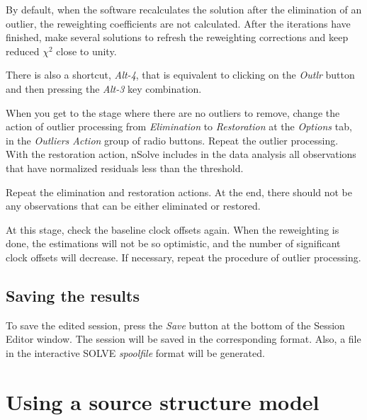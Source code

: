 \documentclass [10pt,letterpaper]{report}
\newcommand{\nuSolve}{\greektext n\latintext Solve}
\begin{document}
By default, when the software recalculates the solution after the
elimination of an outlier, the reweighting coefficients are not
calculated. After the iterations have finished, make several solutions
to refresh the reweighting corrections and keep reduced $\chi^2$ close to unity.

There is also a shortcut, {\sl Alt-4}, that is equivalent to
clicking on the {\sl Outlr} button and then pressing the {\sl
Alt-3} key combination.

When you get to the stage where there are no outliers to remove, change
the action of outlier processing from {\sl Elimination} to {\sl
Restoration} at the {\sl Options} tab, in the {\sl Outliers
Action} group of radio buttons. Repeat the outlier processing. With
the restoration action, \nuSolve{} includes in the data analysis all
observations that have normalized residuals less than the threshold.

Repeat the elimination and restoration actions. At the end, there should
not be any observations that can be either eliminated or restored.

At this stage, check the baseline clock offsets again. When the
reweighting is done, the estimations will not be so optimistic, and the
number of significant clock offsets will decrease. If necessary, repeat
the procedure of outlier processing.



\subsection{Saving the results}
To save the edited session, press the {\sl Save} button at the
bottom of the Session Editor window. The session will be saved in the
corresponding format. Also, a file in the interactive SOLVE {\sl
spoolfile} format will be generated.





\section{Using a source structure model}
\label{section-using-gui-ssm}
\end{document}
